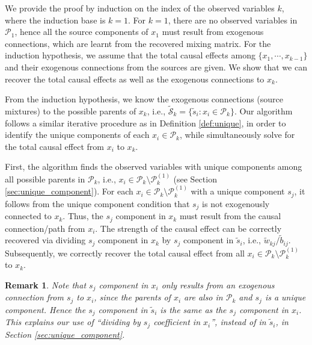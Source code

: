 \documentclass[12pt]{article}
\newtheorem{remark}{Remark}
\newcommand{\setS}{\mathcal{S}}
\begin{document}
We provide the proof by induction on the index of the observed variables $k$, where the induction base is $k=1$. For $k=1$, there are no observed variables in $\mathcal{P}_1$, hence all the source components of $x_1$ must result from exogenous connections, which are learnt from the recovered mixing matrix. For the induction hypothesis, we assume that the total causal effects among $\{x_1,\cdots,x_{k-1}\}$ and their exogenous connections from the sources are given. We show that we can recover the total causal effects as well as the exogenous connections to $x_k$.

From the induction hypothesis, we know the exogenous connections (source mixtures) to the possible parents of $x_k$, i.e., $\tilde{\setS}_k = \{\tilde{s}_i:x_i\in \mathcal{P}_k\}$. Our algorithm follows a similar iterative procedure as in Definition \ref{def:unique}, in order to identify the unique components of each $x_i\in\mathcal{P}_k$, while simultaneously solve for the total causal effect from $x_i$ to $x_k$. 

First, the algorithm finds the observed variables with unique components among all possible parents in $\mathcal{P}_k$, i.e.,  $x_i\in \mathcal{P}_k\setminus \mathcal{P}_k^{(1)}$ (see Section \ref{sec:unique_component}). For each $x_i\in \mathcal{P}_k\setminus \mathcal{P}_k^{(1)}$ with a unique component $s_j$, it follows from the unique component condition that $s_j$ is not exogenously connected to $x_k$. Thus, the $s_j$ component in $x_k$ must result from the causal connection/path from $x_i$. The strength of the causal effect can be correctly recovered via dividing $s_j$ component in $x_k$ by $s_j$ component in $\tilde{s}_i$, i.e., $\tilde{w}_{kj}/\tilde{b}_{ij}$. Subsequently, we correctly recover the total causal effect from all $x_i\in \mathcal{P}_k\setminus \mathcal{P}_k^{(1)}$ to $x_k$.

\begin{remark} \label{remark:sufficiency_calculation}
Note that $s_j$ component in $x_i$ only results from an exogenous connection from $s_j$ to $x_i$, since the parents of $x_i$ are also in $\mathcal{P}_k$ and $s_j$ is a unique component. Hence the $s_j$ component in $\tilde{s}_i$ is the same as the $s_j$ component in $x_i$. This explains our use of ``dividing by $s_j$ coefficient in $x_i$'', instead of in $\tilde{s}_i$, in Section \ref{sec:unique_component}.
\end{remark}
 
\end{document}
